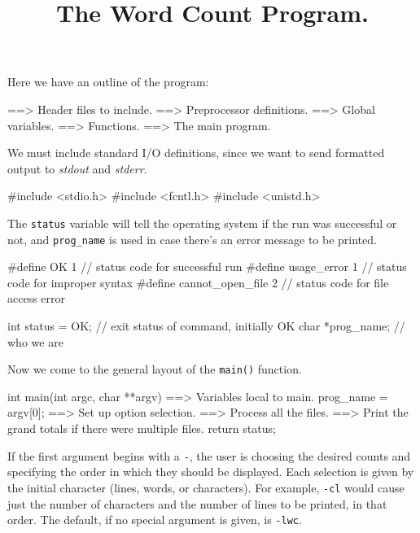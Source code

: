 \documentclass[11pt,a4paper]{article}
\title{The Word Count Program.}
\begin{document}
\maketitle

Here we have an outline of the program:

\begin{code}[language=c,]
==> Header files to include.
==> Preprocessor definitions.
==> Global variables.
==> Functions.
==> The main program.
\end{code}

We must include standard I/O definitions, since we want to send formatted output to \emph{stdout}
and \emph{stderr}.

\begin{code}[language=c,name={Header files to include}]
#include <stdio.h>
#include <fcntl.h>
#include <unistd.h>
\end{code}

The \texttt{status} variable will tell the operating system if the run was successful or not, and
\texttt{prog\_name} is used in case there's an error message to be printed.

\begin{code}[language=c,name={Preprocessor definitions}]
#define OK 1                // status code for successful run
#define usage_error 1       // status code for improper syntax
#define cannot_open_file 2  // status code for file access error
\end{code}

\begin{code}[language=c,name={Global variables}]
int status = OK;  // exit status of command, initially OK
char *prog_name;  // who we are
\end{code}

Now we come to the general layout of the \texttt{main()} function.

\begin{code}[language=c,name={The main program}]
int main(int argc, char **argv)
{
    ==> Variables local to main.
    prog_name = argv[0];
    ==> Set up option selection.
    ==> Process all the files.
    ==> Print the grand totals if there were multiple files.
    return status;
}
\end{code}

If the first argument begins with a \texttt{-}, the user is choosing the desired counts and
specifying the order in which they should be displayed. Each selection is given by the initial
character  (lines, words, or characters). For example, \texttt{-cl} would cause just the number of
characters and the number of lines to be printed, in that order. The default, if no special argument
is given, is \texttt{-lwc}.
\end{document}
